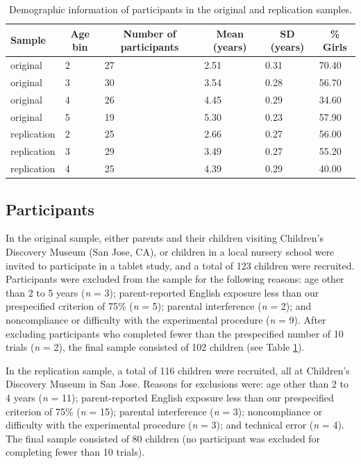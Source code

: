 \documentclass[man]{apa6}
\theoremstyle{definition}
\theoremstyle{definition}
\theoremstyle{definition}
\theoremstyle{remark}
\begin{document}
\begin{table}[tbp]
\begin{center}
\begin{threeparttable}
\caption{\label{tab:participantsummarytab}Demographic information of participants in the original and replication samples.}
\begin{tabular}{llllll}
\toprule
Sample & \multicolumn{1}{c}{Age bin} & \multicolumn{1}{c}{Number of participants} & \multicolumn{1}{c}{Mean (years)} & \multicolumn{1}{c}{SD (years)} & \multicolumn{1}{c}{\% Girls}\\
\midrule
original & 2 & 27 & 2.51 & 0.31 & 70.40\\
original & 3 & 30 & 3.54 & 0.28 & 56.70\\
original & 4 & 26 & 4.45 & 0.29 & 34.60\\
original & 5 & 19 & 5.30 & 0.23 & 57.90\\
replication & 2 & 25 & 2.66 & 0.27 & 56.00\\
replication & 3 & 29 & 3.49 & 0.27 & 55.20\\
replication & 4 & 25 & 4.39 & 0.29 & 40.00\\
\bottomrule
\end{tabular}
\end{threeparttable}
\end{center}
\end{table}

\subsection{Participants}\label{participants}

In the original sample, either parents and their children visiting
Children's Discovery Museum (San Jose, CA), or children in a local
nursery school were invited to participate in a tablet study, and a
total of 123 children were recruited. Participants were excluded from
the sample for the following reasons: age other than 2 to 5 years
(\emph{n} = 3); parent-reported English exposure less than our
prespecified criterion of 75\% (\emph{n} = 5); parental interference
(\emph{n} = 2); and noncompliance or difficulty with the experimental
procedure (\emph{n} = 9). After excluding participants who completed
fewer than the prespecified number of 10 trials (\emph{n} = 2), the
final sample consisted of 102 children (see Table
\ref{tab:participantsummarytab}).

In the replication sample, a total of 116 children were recruited, all
at Children's Discovery Museum in San Jose. Reasons for exclusions were:
age other than 2 to 4 years (\emph{n} = 11); parent-reported English
exposure less than our prespecified criterion of 75\% (\emph{n} = 15);
parental interference (\emph{n} = 3); noncompliance or difficulty with
the experimental procedure (\emph{n} = 3); and technical error (\emph{n}
= 4). The final sample consisted of 80 children (no participant was
excluded for completing fewer than 10 trials).
\end{document}
